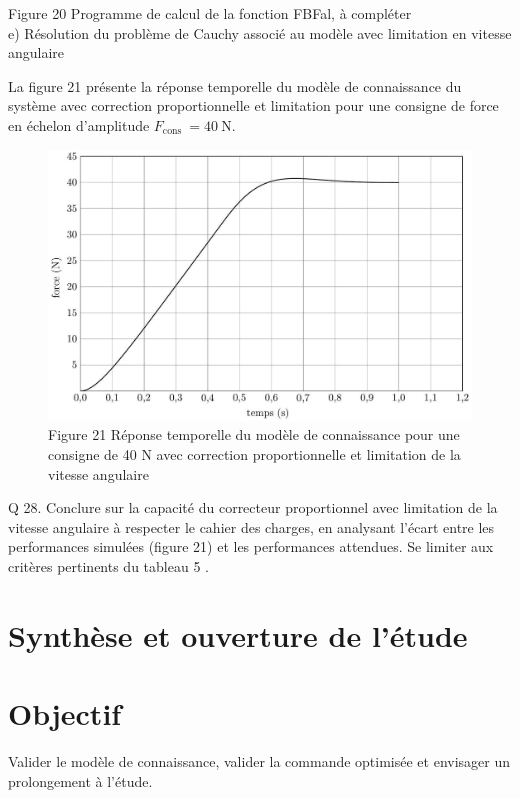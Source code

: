 \documentclass[10pt]{article}
\begin{document}
Figure 20 Programme de calcul de la fonction FBFal, à compléter\\
e) Résolution du problème de Cauchy associé au modèle avec limitation en vitesse angulaire

La figure 21 présente la réponse temporelle du modèle de connaissance du système avec correction proportionnelle et limitation pour une consigne de force en échelon d'amplitude $F_{\text {cons }}=40 \mathrm{~N}$.

\begin{figure}[h]
\begin{center}
  \includegraphics[width=\textwidth]{2025_09_16_5f2d7643f7e649c6833dg-14}
\captionsetup{labelformat=empty}
\caption{Figure 21 Réponse temporelle du modèle de connaissance pour une consigne de 40 N avec correction proportionnelle et limitation de la vitesse angulaire}
\end{center}
\end{figure}

Q 28. Conclure sur la capacité du correcteur proportionnel avec limitation de la vitesse angulaire à respecter le cahier des charges, en analysant l'écart entre les performances simulées (figure 21) et les performances attendues. Se limiter aux critères pertinents du tableau 5 .

\section{Synthèse et ouverture de l'étude}
\section{Objectif}
Valider le modèle de connaissance, valider la commande optimisée et envisager un prolongement à l'étude.
\end{document}
